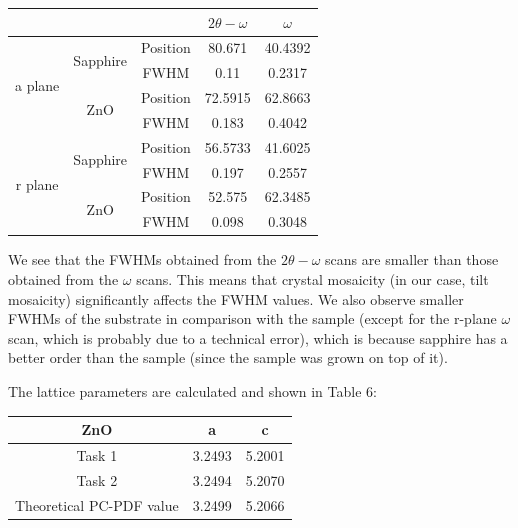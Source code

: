\documentclass{article}
\begin{document}
\begin{table}[h]
    \centering
	\begin{tabular}{|ccc|c|c|}
	\hline
	\multicolumn{3}{|c|}{}                                                             & $2 \theta - \omega$ & $\omega$   \\ \hline
	\multicolumn{1}{|c|}{\multirow{4}{*}{a plane}} & \multicolumn{1}{c|}{\multirow{2}{*}{Sapphire}} & Position & 80.671  & 40.4392 \\ \cline{3-5} 
	\multicolumn{1}{|c|}{} & \multicolumn{1}{c|}{}                          & FWHM     & 0.11          & 0.2317  \\ \cline{2-5} 
	\multicolumn{1}{|c|}{} & \multicolumn{1}{c|}{\multirow{2}{*}{ZnO}} & Position & 72.5915       & 62.8663 \\ \cline{3-5} 
	\multicolumn{1}{|c|}{} & \multicolumn{1}{c|}{}                          & FWHM     & 0.183         & 0.4042  \\ \hline
	\multicolumn{1}{|c|}{\multirow{4}{*}{r plane}} & \multicolumn{1}{c|}{\multirow{2}{*}{Sapphire}} & Position & 56.5733 & 41.6025 \\ \cline{3-5} 
	\multicolumn{1}{|c|}{} & \multicolumn{1}{c|}{}                          & FWHM     & 0.197         & 0.2557  \\ \cline{2-5} 
	\multicolumn{1}{|c|}{} & \multicolumn{1}{c|}{\multirow{2}{*}{ZnO}} & Position & 52.575        & 62.3485 \\ \cline{3-5} 
	\multicolumn{1}{|c|}{} & \multicolumn{1}{c|}{}                          & FWHM     & 0.098         & 0.3048  \\ \hline
	\end{tabular}
\end{table}



We see that the FWHMs obtained from the $2\theta - \omega$ scans are smaller than those obtained from the $\omega$ scans. This means that crystal mosaicity (in our case, tilt mosaicity) significantly affects the FWHM values. We also observe smaller FWHMs of the substrate in comparison with the sample (except for the r-plane $\omega$ scan, which is probably due to a technical error), which is because sapphire has a better order than the sample (since the sample was grown on top of it).


	The lattice parameters are calculated and shown in Table 6: 

\begin{table}[h]
\centering
\begin{tabular}{|c|c|c|}
\hline
ZnO                      & a      & c      \\ \hline
Task 1                   & 3.2493 & 5.2001 \\ \hline
Task 2                   & 3.2494 & 5.2070 \\ \hline
Theoretical PC-PDF value & 3.2499 & 5.2066 \\ \hline
\end{tabular}
\end{table}
\end{document}
